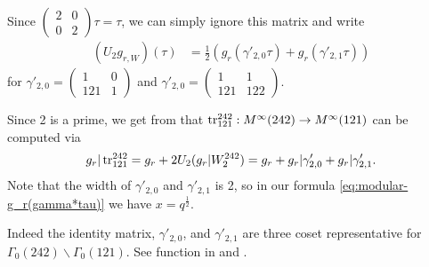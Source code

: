\documentclass{article}
\begin{document}
\begin{Hemmecke}
Since $\left(\begin{smallmatrix}2&0\\0&2\end{smallmatrix}\right)\tau =
\tau$, we can simply ignore this matrix and write
\begin{align*}
  (U_2 g_{r, W})(\tau)
  &=
    \frac{1}{2}\left(g_r(\gamma'_{2,0}\tau) + g_r(\gamma'_{2,1}\tau)\right)
\end{align*}
for
$\gamma'_{2,0} =
\left(\begin{smallmatrix}1&0\\121&1\end{smallmatrix}\right)$ and
$\gamma'_{2,0} =
\left(\begin{smallmatrix}1&1\\121&122\end{smallmatrix}\right)$.

Since 2 is a prime, we get from
\cite{Kohnen_WeierstrassPointsAtInfinity_2004} that
$\operatorname{tr}_{121}^{242}: M^\infty(242) \to M^\infty(121)$ can be computed via
\begin{gather*}
  g_r|\operatorname{tr}_{121}^{242}
  = g_r + 2 U_2(g_r|W_2^{242})
  = g_r + g_r|\gamma'_{2,0} + g_r|\gamma'_{2,1}.
\end{gather*}
Note that the width of $\gamma'_{2,0}$ and $\gamma'_{2,1}$ is 2, so in
our formula \eqref{eq:modular-g_r(gamma*tau)} we have
$x=q^{\frac{1}{2}}$.

Indeed the identity matrix, $\gamma'_{2,0}$, and $\gamma'_{2,1}$ are
three coset representative for
$\Gamma_0(242) \backslash \Gamma_0(121)$.
%
See function  in
 and \cite[Lemma~2.44]{Radu_PhD_2010}.

\end{Hemmecke}
\end{document}
